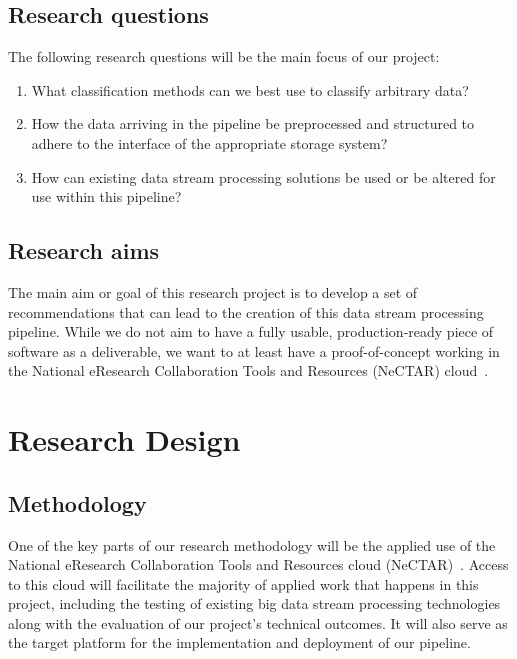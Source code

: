 \documentclass[a4paper,11pt]{article}
\begin{document}
\subsection{Research questions} %
\label{sub:research_questions}

The following research questions will be the main focus of our project:

\begin{enumerate}
  \item What classification methods can we best use to classify arbitrary data?
  \item How the data arriving in the pipeline be preprocessed and structured to adhere to the interface of the appropriate
   storage system?
  \item How can existing data stream processing solutions be used or be altered for use within this pipeline?
\end{enumerate}



\subsection{Research aims} %
\label{sub:research_aims}

The main aim or goal of this research project is to develop a set of recommendations that can lead to the creation of
this data stream processing pipeline. While we do not aim to have a fully usable, production-ready piece of software as a
deliverable, we want to at least have a proof-of-concept working in the National eResearch Collaboration Tools and Resources
(NeCTAR) cloud~\cite{web:Nectar}.





\section{Research Design} %
\label{sec:research_design}

\subsection{Methodology} %
\label{sub:methodology}

One of the key parts of our research methodology will be the applied use of the National eResearch Collaboration Tools and Resources cloud (NeCTAR)~\cite{web:Nectar}. Access to this cloud will facilitate the majority of applied work that happens in this project, including the testing of existing big data stream processing technologies along with the evaluation of our project's technical outcomes. It will also serve as the target platform for the implementation and deployment of our pipeline.
\end{document}

